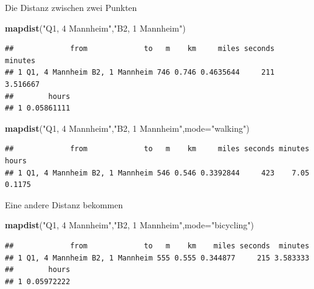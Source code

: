 \documentclass[ignorenonframetext,]{beamer}
\newenvironment{Shaded}{}{}
\newcommand{\KeywordTok}[1]{\textcolor[rgb]{0.00,0.44,0.13}{\textbf{{#1}}}}
\newcommand{\DataTypeTok}[1]{\textcolor[rgb]{0.56,0.13,0.00}{{#1}}}
\newcommand{\StringTok}[1]{\textcolor[rgb]{0.25,0.44,0.63}{{#1}}}
\newcommand{\NormalTok}[1]{{#1}}
\begin{document}
\begin{frame}[fragile]{Die Distanz zwischen zwei Punkten}

\begin{Shaded}
\begin{Highlighting}[]
\KeywordTok{mapdist}\NormalTok{(}\StringTok{"Q1, 4 Mannheim"}\NormalTok{,}\StringTok{"B2, 1 Mannheim"}\NormalTok{)}
\end{Highlighting}
\end{Shaded}

\begin{verbatim}
##             from             to   m    km     miles seconds  minutes
## 1 Q1, 4 Mannheim B2, 1 Mannheim 746 0.746 0.4635644     211 3.516667
##        hours
## 1 0.05861111
\end{verbatim}

\begin{Shaded}
\begin{Highlighting}[]
\KeywordTok{mapdist}\NormalTok{(}\StringTok{"Q1, 4 Mannheim"}\NormalTok{,}\StringTok{"B2, 1 Mannheim"}\NormalTok{,}\DataTypeTok{mode=}\StringTok{"walking"}\NormalTok{)}
\end{Highlighting}
\end{Shaded}

\begin{verbatim}
##             from             to   m    km     miles seconds minutes  hours
## 1 Q1, 4 Mannheim B2, 1 Mannheim 546 0.546 0.3392844     423    7.05 0.1175
\end{verbatim}

\end{frame}

\begin{frame}[fragile]{Eine andere Distanz bekommen}

\begin{Shaded}
\begin{Highlighting}[]
\KeywordTok{mapdist}\NormalTok{(}\StringTok{"Q1, 4 Mannheim"}\NormalTok{,}\StringTok{"B2, 1 Mannheim"}\NormalTok{,}\DataTypeTok{mode=}\StringTok{"bicycling"}\NormalTok{)}
\end{Highlighting}
\end{Shaded}

\begin{verbatim}
##             from             to   m    km    miles seconds  minutes
## 1 Q1, 4 Mannheim B2, 1 Mannheim 555 0.555 0.344877     215 3.583333
##        hours
## 1 0.05972222
\end{verbatim}

\end{frame}
\end{document}
